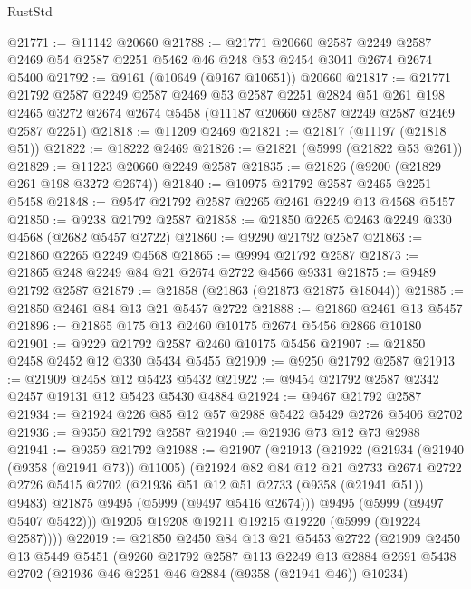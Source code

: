 \begin{lexlean}{RustStd}
\begin{coremodule}
@21771 := @11142 @20660
@21788 := @21771
    @20660
    @2587
    @2249
    @2587
    @2469
    @54
    @2587
    @2251
    @5462
    @46
    @248
    @53
    @2454
    @3041
    @2674
    @2674
    @5400
@21792 := @9161 (@10649 (@9167 @10651)) @20660
@21817 := @21771
    @21792
    @2587
    @2249
    @2587
    @2469
    @53
    @2587
    @2251
    @2824
    @51
    @261
    @198
    @2465
    @3272
    @2674
    @2674
    @5458
    (@11187 @20660 @2587 @2249 @2587 @2469 @2587 @2251)
@21818 := @11209 @2469
@21821 := @21817 (@11197 (@21818 @51))
@21822 := @18222 @2469
@21826 := @21821 (@5999 (@21822 @53 @261))
@21829 := @11223 @20660 @2249 @2587
@21835 := @21826 (@9200 (@21829 @261 @198 @3272 @2674))
@21840 := @10975 @21792 @2587 @2465 @2251 @5458
@21848 := @9547 @21792 @2587 @2265 @2461 @2249 @13 @4568 @5457
@21850 := @9238 @21792 @2587
@21858 := @21850 @2265 @2463 @2249 @330 @4568 (@2682 @5457 @2722)
@21860 := @9290 @21792 @2587
@21863 := @21860 @2265 @2249 @4568
@21865 := @9994 @21792 @2587
@21873 := @21865 @248 @2249 @84 @21 @2674 @2722 @4566 @9331
@21875 := @9489 @21792 @2587
@21879 := @21858 (@21863 (@21873 @21875 @18044))
@21885 := @21850 @2461 @84 @13 @21 @5457 @2722
@21888 := @21860 @2461 @13 @5457
@21896 := @21865 @175 @13 @2460 @10175 @2674 @5456 @2866 @10180
@21901 := @9229 @21792 @2587 @2460 @10175 @5456
@21907 := @21850 @2458 @2452 @12 @330 @5434 @5455
@21909 := @9250 @21792 @2587
@21913 := @21909 @2458 @12 @5423 @5432
@21922 := @9454 @21792 @2587 @2342 @2457 @19131 @12 @5423 @5430 @4884
@21924 := @9467 @21792 @2587
@21934 := @21924 @226 @85 @12 @57 @2988 @5422 @5429 @2726 @5406 @2702
@21936 := @9350 @21792 @2587
@21940 := @21936 @73 @12 @73 @2988
@21941 := @9359 @21792
@21988 := @21907
    (@21913
      (@21922
        (@21934
          (@21940 (@9358 (@21941 @73)) @11005)
          (@21924
            @82
            @84
            @12
            @21
            @2733
            @2674
            @2722
            @2726
            @5415
            @2702
            (@21936 @51 @12 @51 @2733 (@9358 (@21941 @51)) @9483)
            @21875
            @9495
            (@5999 (@9497 @5416 @2674)))
          @9495
          (@5999 (@9497 @5407 @5422)))
        @19205
        @19208
        @19211
        @19215
        @19220
        (@5999 (@19224 @2587))))
@22019 := @21850
    @2450
    @84
    @13
    @21
    @5453
    @2722
    (@21909
      @2450
      @13
      @5449
      @5451
      (@9260
        @21792
        @2587
        @113
        @2249
        @13
        @2884
        @2691
        @5438
        @2702
        (@21936 @46 @2251 @46 @2884 (@9358 (@21941 @46)) @10234)

\end{coremodule}
\end{lexlean}

